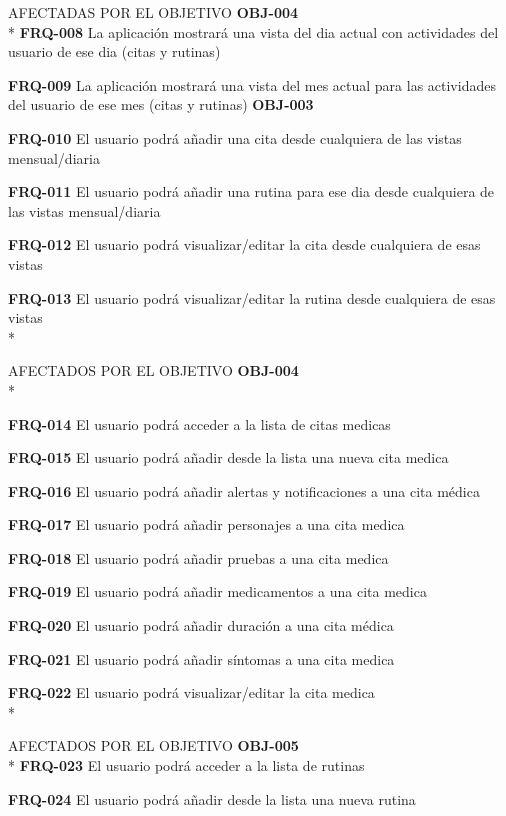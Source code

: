 \documentclass[../pfc.tex]{subfiles}
\begin{document}
	
	AFECTADAS POR EL OBJETIVO \textbf{OBJ-004}\\*
	\textbf{FRQ-008}	La aplicación mostrará una vista del dia actual con actividades del usuario de ese dia (citas y rutinas)
	
	\textbf{FRQ-009}	La aplicación mostrará una vista del mes actual para las actividades del usuario de ese mes (citas y rutinas)	\textbf{OBJ-003}
	
	\textbf{FRQ-010}	El usuario podrá añadir una cita desde cualquiera de las vistas mensual/diaria
	
	\textbf{FRQ-011}	El usuario podrá añadir una rutina para ese dia desde cualquiera de las vistas mensual/diaria
	
	\textbf{FRQ-012}	El usuario podrá visualizar/editar la cita desde cualquiera de esas vistas
	
	\textbf{FRQ-013}	El usuario podrá visualizar/editar la rutina desde cualquiera de esas vistas\\*
	
	
	AFECTADOS POR EL OBJETIVO 	\textbf{OBJ-004}\\*
	
	\textbf{FRQ-014}	El usuario podrá acceder a la lista de citas medicas
	
	\textbf{FRQ-015}	El usuario podrá añadir desde la lista una nueva cita medica
	
	\textbf{FRQ-016}	El usuario podrá añadir alertas y notificaciones a una cita médica
	
	\textbf{FRQ-017}	El usuario podrá añadir personajes a una cita medica
	
	\textbf{FRQ-018}	El usuario podrá añadir pruebas a una cita medica
	
	\textbf{FRQ-019}	El usuario podrá añadir medicamentos a una cita medica
	
	\textbf{FRQ-020}	El usuario podrá añadir duración a una cita médica
	
	\textbf{FRQ-021}	El usuario podrá añadir síntomas a una cita medica
	
	\textbf{FRQ-022}	El usuario podrá visualizar/editar la cita medica\\*
	
	
	
	AFECTADOS POR EL OBJETIVO 	\textbf{OBJ-005}\\*
	\textbf{FRQ-023}	El usuario podrá acceder a la lista de rutinas
	
	\textbf{FRQ-024}	El usuario podrá añadir desde la lista una nueva rutina
	
\end{document}
